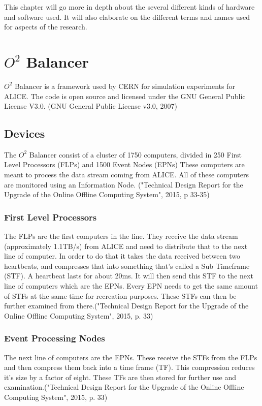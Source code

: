 This chapter will go more in depth about the several different kinds of hardware and software used. It will also elaborate on the different terms and names used for aspects of the research.
\section{$O^2$ Balancer}
$O^2$ Balancer is a framework used by CERN for simulation experiments for ALICE. The code is open source and licensed under the GNU General Public License V3.0. (GNU General Public License v3.0, 2007)

\subsection{Devices}
The $O^2$ Balancer consist of a cluster of 1750 computers, divided in 250 First Level Processors (FLPs) and 1500 Event  Nodes (EPNs) These computers are meant to process the data stream coming from ALICE. All of these computers are monitored using an Information Node. ("Technical Design Report for the Upgrade of the Online Offline Computing System", 2015, p 33-35)

\subsubsection*{First Level Processors}
The FLPs are the first computers in the line. They receive the data stream (approximately 1.1TB/s) from ALICE and need to distribute that to the next line of computer. In order to do that it takes the data received between two heartbeats, and compresses that into something that's called a Sub Timeframe (STF). A heartbeat lasts for about 20ms. It will then send this STF to the next line of computers which are the EPNs. Every EPN needs to get the same amount of STFs at the same time for recreation purposes. These STFs can then be further examined from there.("Technical Design Report for the Upgrade of the Online Offline Computing System", 2015, p. 33)

\subsubsection*{Event Processing Nodes}
The next line of computers are the EPNs. These receive the STFs from the FLPs and then compress them back into a time frame (TF). This compression reduces it's size by a factor of eight. These TFs are then stored for further use and examination.("Technical Design Report for the Upgrade of the Online Offline Computing System", 2015, p. 33)

